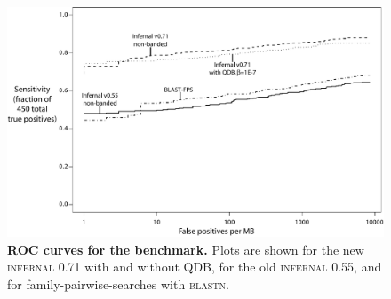 \begin{figure}
\begin{center}
\includegraphics[width=6.4in,angle=0]{figs/roc}
\end{center}
\caption{\textbf{ROC curves for the benchmark.}  Plots are shown for
the new \textsc{infernal} 0.71 with and without QDB, for the old
\textsc{infernal 0.55}, and for family-pairwise-searches with \textsc{blastn}.
}
\label{fig:roc}
\end{figure}
